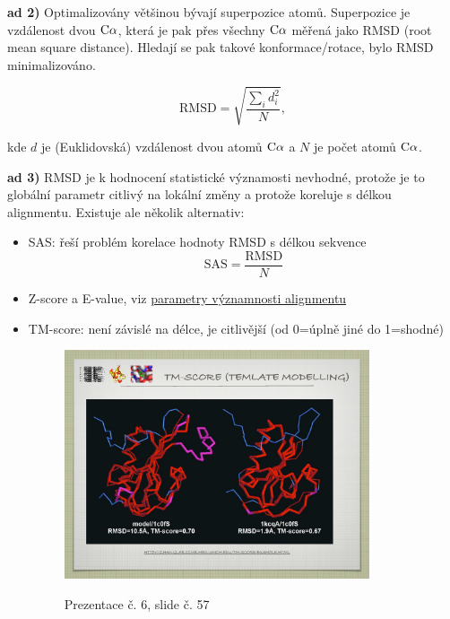 \documentclass[DIV=8]{scrreprt}
\begin{document}
\textbf{ad 2)} Optimalizovány většinou bývají superpozice atomů. Superpozice je vzdálenost dvou \(\ce{C\alpha}\), která je pak přes všechny \(\ce{C\alpha}\) měřená jako RMSD (root mean square distance). Hledají se pak takové konformace/rotace, bylo RMSD minimalizováno.

\[\text{RMSD} = \sqrt{\frac{\sum_i d_i^2}{N}},\]

kde \(d\) je (Euklidovská) vzdálenost dvou atomů \(\ce{C\alpha}\) a \(N\) je počet atomů \(\ce{C\alpha}\).

\textbf{ad 3)} RMSD je k hodnocení statistické významosti nevhodné, protože je to globální parametr citlivý na lokální změny a protože koreluje s délkou alignmentu. Existuje ale několik alternativ:
\begin{itemize}[nosep]
    \item SAS: řeší problém korelace hodnoty RMSD s délkou sekvence
  \[\text{SAS} = \frac{\text{RMSD}}{N}\]
    \item Z-score a E-value, viz \hyperref[Parametry významnosti alignmentu]{para­me­try výz­nam­nos­ti align­men­tu}
    \item TM-score: není závislé na délce, je citlivější (od 0=úplně jiné do 1=shodné) \begin{figure}
    \caption{Prezentace č. 6, slide č. 57}
    \includegraphics[width=0.85\textwidth]{slides-6/slide-57.jpg}
    \centering
    \label{slides-6-slide-57}
\end{figure}

\end{itemize}
\end{document}
